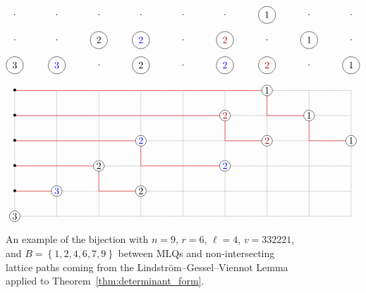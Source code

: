 \documentclass[reqno]{amsart}
\newcommand{\0}{\phantom{c}}
\newcommand{\set}[1]{\left\{ #1 \right\}}
\theoremstyle{plain}
\theoremstyle{definition}
\numberwithin{equation}{section}
\begin{document}
\begin{figure}[t]
\[
\begin{tikzpicture}[xscale=1.5,yscale=0.9]
  \begin{scope}[yshift=7cm]
    \foreach \i in {1,...,9}{
      \foreach \j in {0,1,2}{
        \node at (\i,\j){$\cdot$};
      }
    }
    \node[circle,fill=white,draw=black] at  (1, 0){$3$};
    \node[circle,fill=white,draw=black,text=blue] at  (2, 0){$3$};
    \node[circle,fill=white,draw=black] at  (4, 0){$2$};
    \node[circle,fill=white,draw=black,text=blue] at  (6, 0){$2$};
    \node[circle,fill=white,draw=black,text=darkred] at  (7, 0){$2$};
    \node[circle,fill=white,draw=black] at  (9, 0){$1$};
    \node[circle,fill=white,draw=black] at  (3, 1){$2$};
    \node[circle,fill=white,draw=black,text=blue] at  (4, 1){$2$};
    \node[circle,fill=white,draw=black,text=darkred] at  (6, 1){$2$};
    \node[circle,fill=white,draw=black] at  (8, 1){$1$};
    \node[circle,fill=white,draw=black] at  (7, 2){$1$};
  \end{scope}

  \draw[densely dotted] (1,1) grid (9,6);

  \draw[draw=red] (1,2)--(2,2);
  \draw[draw=red] (1,3)--(3,3)--(3,2)--(4,2);
  \draw[draw=red] (1,4)--(4,4)--(4,3)--(6,3);
  \draw[draw=red] (1,5)--(6,5)--(6,4)--(7,4);
  \draw[draw=red] (1,6)--(7,6)--(7,5)--(8,5)--(8,4)--(9,4);
  
  \node[circle,fill=white,draw=black,inner sep=1pt] at (1,1) {$3$};
  \node[circle,fill=white,draw=black,text=blue,inner sep=1pt] at (2,2) {$3$};
  \node[circle,fill=white,draw=black,inner sep=1pt] at (4,2) {$2$};
  \node[circle,fill=white,draw=black,inner sep=1pt] at (3,3) {$2$};
  \node[circle,fill=white,draw=black,text=blue,inner sep=1pt] at (4,4) {$2$};
  \node[circle,fill=white,draw=black,text=blue,inner sep=1pt] at (6,3) {$2$};
  \node[circle,fill=white,draw=black,text=darkred,inner sep=1pt] at (6,5) {$2$};
  \node[circle,fill=white,draw=black,text=darkred,inner sep=1pt] at (7,4) {$2$};
  \node[circle,fill=white,draw=black,inner sep=1pt] at (7,6) {$1$};
  \node[circle,fill=white,draw=black,inner sep=1pt] at (8,5) {$1$};
  \node[circle,fill=white,draw=black,inner sep=1pt] at (9,4) {$1$};

  \foreach \i in {2,...,6} {
    \node at (1,\i){\textbullet};
  }
\end{tikzpicture}
\]
\caption{An example of the bijection with $n = 9$, $r = 6$, $\ell = 4$, $v = 332221$, and $B = \set{1,2,4,6,7,9}$ between MLQs and non-intersecting lattice paths coming from the Lindstr\"om--Gessel--Viennot Lemma~\cite{GV85,Lindstrom73} applied to Theorem~\ref{thm:determinant_form}.}
\label{fig:lattice_path_bijection}
\end{figure}
\end{document}
